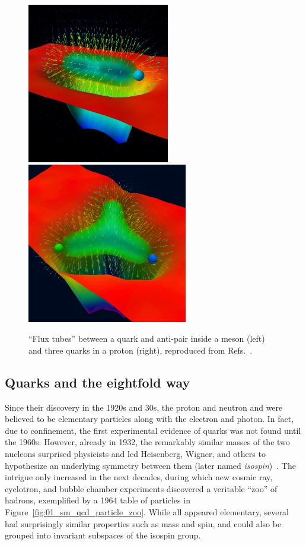 \begin{figure}[ht]
	\centering
	\includegraphics[height=7cm]{figures/01-SM-03-SM/qcd/FluxTube.jpg}
	\hspace{2mm}
	\includegraphics[height=7cm]{figures/01-SM-03-SM/qcd/VacuumRespAction16t32_YshapeCSSMcover.jpg}
	\caption{``Flux tubes'' between a quark and anti-pair inside a meson (left) and three quarks in a proton (right), reproduced from Refs.~\cite{Bissey:2006bz, LeinweberVisualQCD}.}
	\label{fig:01_sm_qcd_fluxtubes}
\end{figure}


\subsection{Quarks and the eightfold way}
\label{sec:01_sm_quarks}

Since their discovery in the 1920s and 30s, the proton and neutron and were believed to be elementary particles along with the electron and photon.
In fact, due to confinement, the first experimental evidence of quarks was not found until the 1960s.
However, already in 1932, the remarkably similar masses of the two nucleons surprised physicists and led Heisenberg, Wigner, and others to hypothesize an underlying \SU[2] symmetry between them (later named \textit{isospin})~\cite{Heisenberg1932, Wigner1937}.
The intrigue only increased in the next decades, during which new cosmic ray, cyclotron, and bubble chamber experiments discovered a veritable ``zoo'' of hadrons, exemplified by a 1964 table of particles in Figure~\ref{fig:01_sm_qcd_particle_zoo}.
While all appeared elementary, several had surprisingly similar properties such as mass and spin, and could also be grouped into invariant subspaces of the isospin group.

